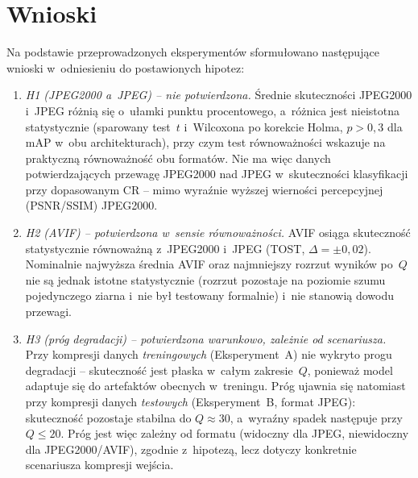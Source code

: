 \documentclass[12pt,a4paper]{article}
\begin{document}
\clearpage
\section{Wnioski}
\label{sec:wnioski}

Na podstawie przeprowadzonych eksperymentów sformułowano następujące wnioski w~odniesieniu do postawionych hipotez:

\begin{enumerate}
    \item \emph{H1 (JPEG2000 a~JPEG) -- nie potwierdzona.} Średnie skuteczności JPEG2000 i~JPEG różnią się o~ułamki punktu procentowego, a~różnica jest nieistotna statystycznie (sparowany test~$t$ i~Wilcoxona po korekcie Holma, $p > 0{,}3$ dla mAP w~obu architekturach), przy czym test równoważności wskazuje na praktyczną równoważność obu formatów. Nie ma więc danych potwierdzających przewagę JPEG2000 nad JPEG w~skuteczności klasyfikacji przy dopasowanym CR -- mimo wyraźnie wyższej wierności percepcyjnej (PSNR/SSIM) JPEG2000.

    \item \emph{H2 (AVIF) -- potwierdzona w~sensie równoważności.} AVIF osiąga skuteczność statystycznie równoważną z~JPEG2000 i~JPEG (TOST, $\Delta=\pm 0{,}02$). Nominalnie najwyższa średnia AVIF oraz najmniejszy rozrzut wyników po~$Q$ nie są jednak istotne statystycznie (rozrzut pozostaje na poziomie szumu pojedynczego ziarna i~nie był testowany formalnie) i~nie stanowią dowodu przewagi.

    \item \emph{H3 (próg degradacji) -- potwierdzona warunkowo, zależnie od scenariusza.} Przy kompresji danych \emph{treningowych} (Eksperyment~A) nie wykryto progu degradacji -- skuteczność jest płaska w~całym zakresie~$Q$, ponieważ model adaptuje się do artefaktów obecnych w~treningu. Próg ujawnia się natomiast przy kompresji danych \emph{testowych} (Eksperyment~B, format JPEG): skuteczność pozostaje stabilna do $Q \approx 30$, a~wyraźny spadek następuje przy $Q \le 20$. Próg jest więc zależny od formatu (widoczny dla JPEG, niewidoczny dla JPEG2000/AVIF), zgodnie z~hipotezą, lecz dotyczy konkretnie scenariusza kompresji wejścia.


\end{enumerate}
\end{document}
